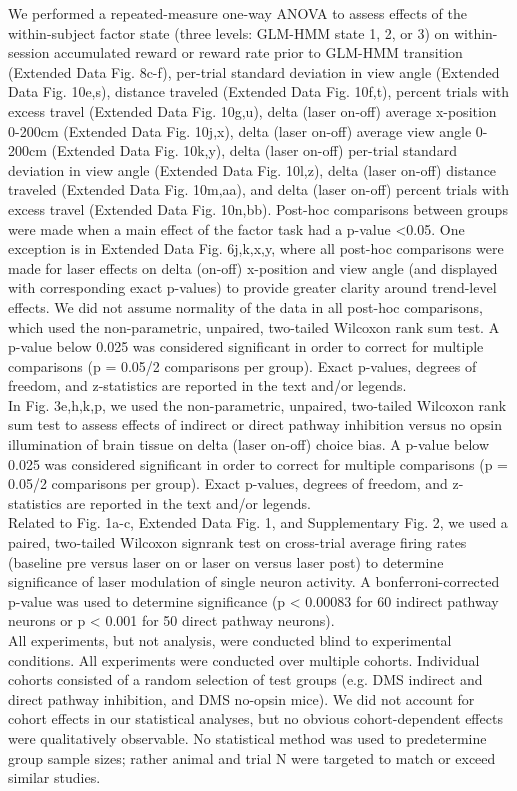 We performed a repeated-measure one-way ANOVA to assess effects of the within-subject factor state (three levels: GLM-HMM state 1, 2, or 3) on within-session accumulated reward or reward rate prior to GLM-HMM transition (Extended Data Fig. 8c-f), per-trial standard deviation in view angle (Extended Data Fig. 10e,s), distance traveled (Extended Data Fig. 10f,t), percent trials with excess travel (Extended Data Fig. 10g,u), delta (laser on-off) average x-position 0-200cm (Extended Data Fig. 10j,x), delta (laser on-off) average view angle 0-200cm (Extended Data Fig. 10k,y), delta (laser on-off) per-trial standard deviation in view angle (Extended Data Fig. 10l,z), delta (laser on-off) distance traveled (Extended Data Fig. 10m,aa), and delta (laser on-off) percent trials with excess travel (Extended Data Fig. 10n,bb). Post-hoc comparisons between groups were made when a main effect of the factor task had a p-value <0.05. One exception is in Extended Data Fig. 6j,k,x,y, where all post-hoc comparisons were made for laser effects on delta (on-off) x-position and view angle (and displayed with corresponding exact p-values) to provide greater clarity around trend-level effects. We did not assume normality of the data in all post-hoc comparisons, which used the non-parametric, unpaired, two-tailed Wilcoxon rank sum test. A p-value below 0.025 was considered significant in order to correct for multiple comparisons (p = 0.05/2 comparisons per group). Exact p-values, degrees of freedom, and z-statistics are reported in the text and/or legends. \\
In Fig. 3e,h,k,p, we used the non-parametric, unpaired, two-tailed Wilcoxon rank sum test to assess effects of indirect or direct pathway inhibition versus no opsin illumination of brain tissue on delta (laser on-off) choice bias. A p-value below 0.025 was considered significant in order to correct for multiple comparisons (p = 0.05/2 comparisons per group). Exact p-values, degrees of freedom, and z-statistics are reported in the text and/or legends. \\
Related to Fig. 1a-c, Extended Data Fig. 1, and Supplementary Fig. 2, we used a paired, two-tailed Wilcoxon signrank test on cross-trial average firing rates (baseline pre versus laser on or laser on versus laser post) to determine significance of laser modulation of single neuron activity. A bonferroni-corrected p-value was used to determine significance (p < 0.00083 for 60 indirect pathway neurons or p < 0.001 for 50 direct pathway neurons). \\
All experiments, but not analysis, were conducted blind to experimental conditions. All experiments were conducted over multiple cohorts. Individual cohorts consisted of a random selection of test groups (e.g. DMS indirect and direct pathway inhibition, and DMS no-opsin mice). We did not account for cohort effects in our statistical analyses, but no obvious cohort-dependent effects were qualitatively observable. No statistical method was used to predetermine group sample sizes; rather animal and trial N were targeted to match or exceed similar studies.

